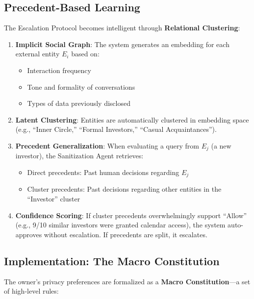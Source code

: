 \subsection{Precedent-Based Learning}

The Escalation Protocol becomes intelligent through \textbf{Relational Clustering}:

\begin{enumerate}
    \item \textbf{Implicit Social Graph}: The system generates an embedding for each external entity $E_i$ based on:
    \begin{itemize}
        \item Interaction frequency
        \item Tone and formality of conversations
        \item Types of data previously disclosed
    \end{itemize}

    \item \textbf{Latent Clustering}: Entities are automatically clustered in embedding space (e.g., ``Inner Circle,'' ``Formal Investors,'' ``Casual Acquaintances'').

    \item \textbf{Precedent Generalization}: When evaluating a query from $E_j$ (a new investor), the Sanitization Agent retrieves:
    \begin{itemize}
        \item Direct precedents: Past human decisions regarding $E_j$
        \item Cluster precedents: Past decisions regarding other entities in the ``Investor'' cluster
    \end{itemize}

    \item \textbf{Confidence Scoring}: If cluster precedents overwhelmingly support ``Allow'' (e.g., 9/10 similar investors were granted calendar access), the system auto-approves without escalation. If precedents are split, it escalates.
\end{enumerate}

\subsection{Implementation: The Macro Constitution}

The owner's privacy preferences are formalized as a \textbf{Macro Constitution}—a set of high-level rules:

